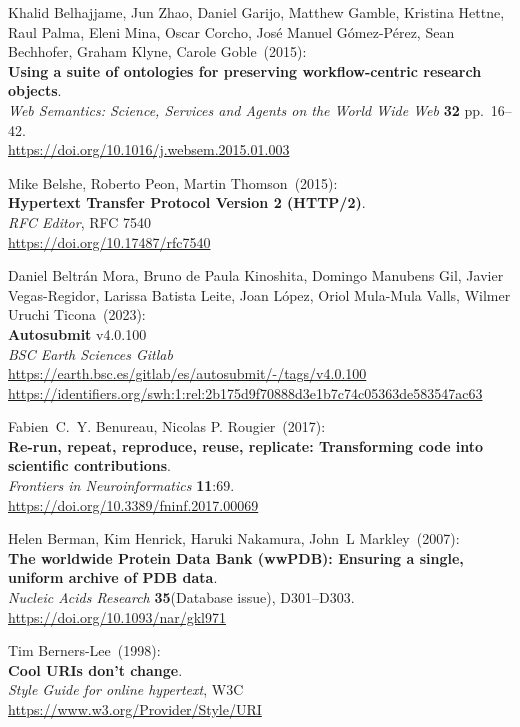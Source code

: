 \begin{thebibliography}{9}
Khalid Belhajjame, Jun Zhao, Daniel Garijo, Matthew Gamble,
Kristina Hettne, Raul Palma, Eleni Mina, Oscar Corcho, José Manuel
Gómez-Pérez, Sean Bechhofer, Graham Klyne, Carole Goble~(2015): \\
\textbf{Using a suite of ontologies for preserving workflow-centric
research objects}.\\
\emph{Web Semantics: Science, Services and Agents on the World Wide Web}
\textbf{32} pp.~16--42.\\
\url{https://doi.org/10.1016/j.websem.2015.01.003}

Mike Belshe, Roberto Peon, Martin Thomson~(2015): \\
\textbf{Hypertext Transfer Protocol Version 2 (HTTP/2)}.\\
\emph{RFC Editor}, RFC 7540\\
\url{https://doi.org/10.17487/rfc7540}

 Daniel Beltrán Mora, Bruno de Paula Kinoshita, Domingo Manubens Gil, Javier Vegas-Regidor, Larissa Batista Leite, Joan López, Oriol Mula-Mula Valls, Wilmer Uruchi Ticona~(2023): \\
\textbf{Autosubmit} v4.0.100\\
\emph{BSC Earth Sciences Gitlab}\\
\url{https://earth.bsc.es/gitlab/es/autosubmit/-/tags/v4.0.100}\\
\url{https://identifiers.org/swh:1:rel:2b175d9f70888d3e1b7c74c05363de583547ac63}

Fabien~C.~Y. Benureau, Nicolas P. Rougier~(2017): \\
\textbf{Re-run, repeat, reproduce, reuse, replicate: Transforming code
into scientific contributions}.\\
\emph{Frontiers in Neuroinformatics} \textbf{11}:69.\\
\url{https://doi.org/10.3389/fninf.2017.00069}

Helen Berman, Kim Henrick, Haruki Nakamura, John~L Markley~(2007): \\
\textbf{The worldwide Protein Data Bank (wwPDB): Ensuring a single,
uniform archive of PDB data}.\\
\emph{Nucleic Acids Research} \textbf{35}(Database issue),
D301--D303.\\
\url{https://doi.org/10.1093/nar/gkl971}

Tim Berners-Lee~(1998): \\
\textbf{Cool {URIs} don't change}. \\
\emph{Style Guide for online hypertext}, W3C \\
\url{https://www.w3.org/Provider/Style/URI} 


\end{thebibliography}
